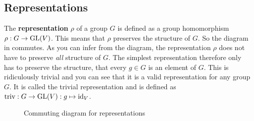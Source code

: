 \subsection{Representations}

The \textbf{representation} $\rho$ of a group $G$ is defined as a group homomorphism $\rho: G \to \text{GL}(V)$.
This means that $\rho$ preserves the structure of $G$.
So the diagram in  commutes.
As you can infer from the diagram, the representation $\rho$ does not have to preserve \textit{all} structure of $G$.
The simplest representation therefore only has to preserve the structure, that every $g \in G$ is an element of $G$.
This is ridiculously trivial and you can see that it is a valid representation for any group $G$.
It is called the trivial representation and is defined as $\text{triv}: G \to \text{GL}(V): g \mapsto \text{id}_V$.
\begin{figure}[h]
    \centering
    \caption{Commuting diagram for representations}
    \label{fig:main.what.rep-cd}
\end{figure}
